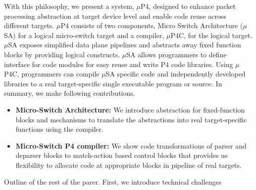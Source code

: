 With this philosophy, we present a system, $\mu$P4, designed to enhance packet processing abstraction at target device level and enable code reuse across different targets.
$\mu$P4 consists of two components, Micro Switch Architecture ($\mu$SA) for a logical micro-switch target and a compiler, $\mu$P4C, for the logical target. 
$\mu$SA exposes simplified data plane pipelines and abstracts away fixed function blocks by providing logical constructs.
$\mu$SA allows programmers to define interface for code modules for easy reuse and write P4 code libraries.
Using $\mu$P4C, programmers can compile $\mu$SA specific code and independently developed libraries to a real target-specific single executable program or source.
In summary, we make following contributions.
\begin{itemize}
\item \textbf{Micro-Switch Architecture:} We introduce abstraction for fixed-function blocks and mechanisms to translate the abstractions into real target-specific functions using the compiler.
\item \textbf{Micro-Switch P4 compiler:} We show code transformations of parser and deparser blocks to match-action based control blocks that provides us flexibility to allocate code at appropriate blocks in pipeline of real targets.
\end{itemize}

Outline of the rest of the parer. 
First, we introduce technical challenges 

